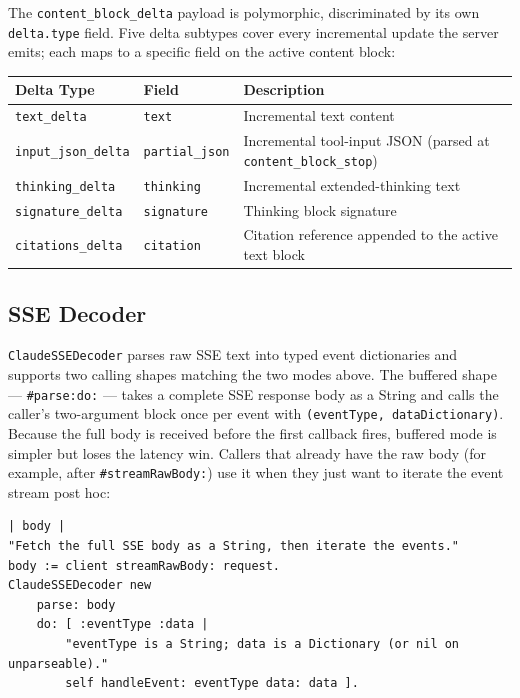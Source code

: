 \documentclass[a4paper,10pt,fleqn]{article}
\newcommand{\cls}[1]{\texttt{#1}}
\newcommand{\sel}[1]{\texttt{\##1}}
\begin{document}
The \texttt{content\_block\_delta} payload is polymorphic,
discriminated by its own \texttt{delta.type} field.  Five delta
subtypes cover every incremental update the server emits; each
maps to a specific field on the active content block:

\begin{center}
\small
\begin{tabular}{@{}llp{6cm}@{}}
\toprule
\textbf{Delta Type} & \textbf{Field} & \textbf{Description} \\
\midrule
\texttt{text\_delta}        & \texttt{text}          & Incremental text content \\
\texttt{input\_json\_delta} & \texttt{partial\_json} & Incremental tool-input JSON (parsed at \texttt{content\_block\_stop}) \\
\texttt{thinking\_delta}    & \texttt{thinking}      & Incremental extended-thinking text \\
\texttt{signature\_delta}   & \texttt{signature}     & Thinking block signature \\
\texttt{citations\_delta}   & \texttt{citation}      & Citation reference appended to the active text block \\
\bottomrule
\end{tabular}
\end{center}

\subsection{SSE Decoder}

\cls{ClaudeSSEDecoder} parses raw SSE text into typed event
dictionaries and supports two calling shapes matching the two
modes above.  The buffered shape --- \sel{parse:do:} --- takes a
complete SSE response body as a String and calls the caller's
two-argument block once per event with
\texttt{(eventType, dataDictionary)}.  Because the full body is
received before the first callback fires, buffered mode is
simpler but loses the latency win.  Callers that already have
the raw body (for example, after \sel{streamRawBody:}) use it
when they just want to iterate the event stream post hoc:

\begin{lstlisting}[language={}]
| body |
"Fetch the full SSE body as a String, then iterate the events."
body := client streamRawBody: request.
ClaudeSSEDecoder new
    parse: body
    do: [ :eventType :data |
        "eventType is a String; data is a Dictionary (or nil on unparseable)."
        self handleEvent: eventType data: data ].
\end{lstlisting}
\end{document}
